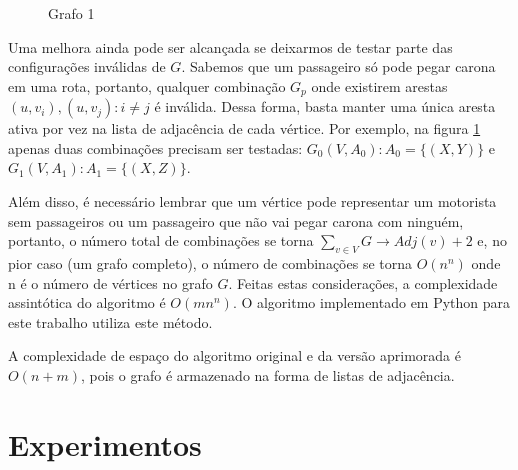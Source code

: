 \documentclass{report}
\begin{document}
\begin{figure}
\begin {center}
\end{center}
\caption{Grafo 1} 
\label{fig:graph}
\end{figure}

Uma melhora ainda pode ser alcançada se deixarmos de testar parte das configurações inválidas de $ G $. Sabemos que 
um passageiro só pode pegar carona em uma rota, portanto, qualquer combinação $ G_p $ onde existirem arestas $ (u, v_i), (u, v_j) : i \neq j $
é inválida. Dessa forma, basta manter uma única aresta ativa por vez na lista de adjacência de cada vértice. Por exemplo, na figura \ref{fig:graph} apenas 
duas combinações precisam ser testadas: $ G_0(V,A_0) : A_0 = \{(X,Y)\} $ e $ G_1(V,A_1) : A_1 = \{(X,Z)\} $.

Além disso, é necessário lembrar que um vértice pode representar um motorista sem passageiros ou um passageiro que não vai pegar carona com ninguém, 
portanto, o número total de combinações 
se torna $ \sum_{v \in V} G \rightarrow Adj(v) + 2 $ e, no pior caso (um grafo completo), o número de combinações se torna $ O(n^n) $ 
onde n é o número de vértices no grafo $ G $. Feitas estas considerações, a complexidade assintótica do algoritmo é $ O(mn^n) $.
O algoritmo implementado em Python para este trabalho utiliza este método.

A complexidade de espaço do algoritmo original e da versão aprimorada é $ O(n + m) $, pois o grafo é armazenado na forma de listas de adjacência.

\chapter{Experimentos}
\end{document}
